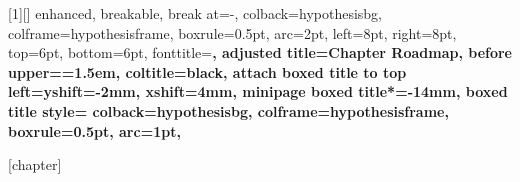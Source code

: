 
[1][]{%
  enhanced,
  breakable,
  break at=-\baselineskip,
  colback=hypothesisbg,
  colframe=hypothesisframe,
  boxrule=0.5pt,
  arc=2pt,
  left=8pt,
  right=8pt,
  top=6pt,
  bottom=6pt,
  fonttitle=\bfseries\sffamily,
  adjusted title={Chapter Roadmap},
  before upper={\parindent=1.5em},
  coltitle=black,
  attach boxed title to top left={yshift=-2mm, xshift=4mm},
  minipage boxed title*=-14mm,
  boxed title style={
    colback=hypothesisbg,
    colframe=hypothesisframe,
    boxrule=0.5pt,
    arc=1pt,
      }
}


\newcommand{\qa}[1]{\refstepcounter{qacounter}\subsection*{Q\theqacounter: #1}}

%

[chapter]
\renewcommand{\theprotocolcounter}{\thechapter.\arabic{protocolcounter}}

